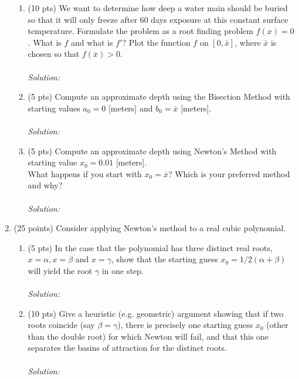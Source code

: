 \documentclass{article}
\begin{document}
\begin{enumerate}
		\begin{enumerate}[label=\roman*]
			\item (10 pts) We want to determine how deep a water main should be buried so that it will only freeze after 60 days exposure at this constant surface temperature. Formulate the problem as a root finding problem $f(x) = 0$. What is $f$ and what is $f'$? Plot the function $f$ on $[0,\bar{x}]$, where $\bar{x}$ is chosen so that $f(\bar{x}) > 0$.\\
			\\
			\textit{Solution:}\\
			
			
			\item (5 pts) Compute an approximate depth using the Bisection Method with starting values $a_0 = 0$ [meters] and $b_0 = \bar{x}$ [meters].\\
			\\
			\textit{Solution:}\\
			
			
			\item (5 pts) Compute an approximate depth using Newton's Method with starting value $x_0 = 0.01$ [meters].\\
			What happens if you start with $x_0 = \bar{x}$? Which is your preferred method and why?\\
			\\
			\textit{Solution:}\\
			
			
		\end{enumerate}
		
		\item (25 points) Consider applying Newton's method to a real cubic polynomial.
		\begin{enumerate}[label=\roman*]
			\item (5 pts) In the case that the polynomial has three distinct real roots, $x = \alpha, x = \beta$ and $x = \gamma$, show that the starting guess $x_0 = 1/2(\alpha + \beta)$ will yield the root $\gamma$ in one step.\\
			\\
			\textit{Solution:}\\
			
			
			\item (10 pts) Give a heuristic (e.g. geometric) argument showing that if two roots coincide (say $\beta = \gamma$), there is precisely one starting guess $x_0$ (other than the double root) for which Newton will fail, and that this one separates the basins of attraction for the distinct roots.\\
			\\
			\textit{Solution:}\\
			

\end{enumerate}
\end{enumerate}
\end{document}
